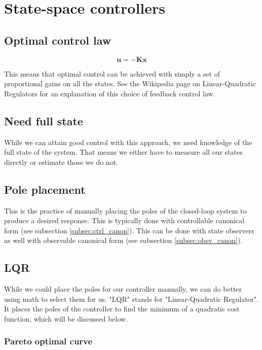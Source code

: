 \documentclass[10pt,conference,compsoc]{IEEEtran}
\newcommand{\mtx}[1] {\bm #1}
\begin{document}
\section{State-space controllers}

\subsection{Optimal control law}

\begin{equation}
  \mtx{u} = -\mtx{K}\mtx{x}
\end{equation}

\noindent This means that optimal control can be achieved with simply a set of
proportional gains on all the states. See the Wikipedia page on Linear-Quadratic
Regulators \cite{bib:lqr} for an explanation of this choice of feedback control
law.

\subsection{Need full state}

\noindent While we can attain good control with this approach, we need knowledge
of the full state of the system. That means we either have to measure all our
states directly or estimate those we do not.

\subsection{Pole placement}

\noindent This is the practice of manually placing the poles of the closed-loop
system to produce a desired response. This is typically done with controllable
canonical form (see subsection \ref{subsec:ctrl_canon}). This can be done with
state observers as well with observable canonical form (see subsection
\ref{subsec:obsv_canon}).

\subsection{LQR}

\noindent While we could place the poles for our controller manually, we can do
better using math to select them for us. "LQR" stands for "Linear-Quadratic
Regulator". It places the poles of the controller to find the minimum of a
quadratic cost function, which will be discussed below.

\subsubsection{Pareto optimal curve}
\end{document}

